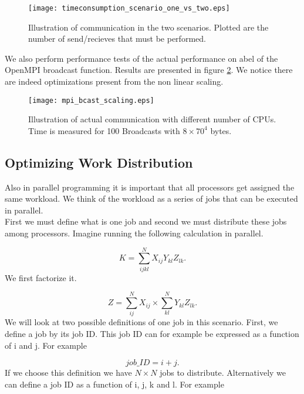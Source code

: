 \begin{figure}[ht!]
\centering
\texttt{[image: timeconsumption\_scenario\_one\_vs\_two.eps]}
\caption{Illustration of communication in the two scenarios. Plotted are the number of send/recieves that must be performed.}
\label{mpi_communication_illustration_thingy2}
\end{figure}

We also perform performance tests of the actual performance on abel of the OpenMPI broadcast function. Results are presented in figure \ref{mpi_communication_real}. We notice there are indeed optimizations present from the non linear scaling. 

\begin{figure}[ht!]
\centering
\texttt{[image: mpi\_bcast\_scaling.eps]}
\caption{Illustration of actual communication with different number of CPUs. Time is measured for 100 Broadcasts with $8 \times 70^4$ bytes.}
\label{mpi_communication_real}
\end{figure}

\subsection{Optimizing Work Distribution \label{work_dist_section_1341}}
Also in parallel programming it is important that all processors get assigned the same workload. We think of the workload as a series of jobs that can be executed in parallel. \\

First we must define what is one job and second we must distribute these jobs among processors. Imagine running the following calculation in parallel.

\begin{equation}
K = \sum_{ijkl}^N X_{ij} Y_{kl} Z_{lk} .
\end{equation}
We first factorize it.

\begin{equation}
Z = \sum_{ij}^N X_{ij} \times \sum_{kl}^N Y_{kl} Z_{lk} .
\end{equation}
We will look at two possible definitions of one job in this scenario. First, we define a job by its job ID. This job ID can for example be expressed as a function of i and j. For example

\begin{equation}
job\_ID = i + j . \label{example_job_distribution}
\end{equation}
If we choose this definition we have $N \times N$ jobs to distribute. Alternatively we can define a job ID as a function of i, j, k and l. For example

